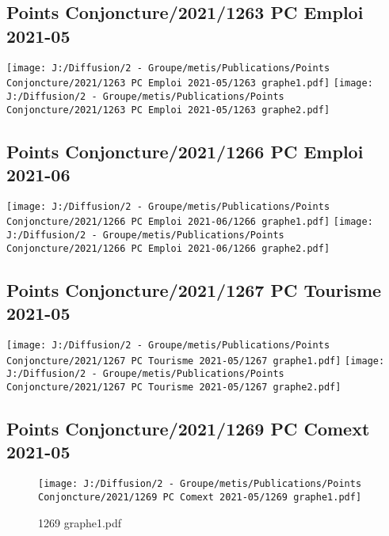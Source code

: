 \documentclass[
]{article}
\begin{document}
\hypertarget{points-conjoncture20211263-pc-emploi-2021-05}{%
\subsection{Points Conjoncture/2021/1263 PC Emploi
2021-05}\label{points-conjoncture20211263-pc-emploi-2021-05}}

\texttt{[image: J:/Diffusion/2 - Groupe/metis/Publications/Points Conjoncture/2021/1263 PC Emploi 2021-05/1263 graphe1.pdf]}
\texttt{[image: J:/Diffusion/2 - Groupe/metis/Publications/Points Conjoncture/2021/1263 PC Emploi 2021-05/1263 graphe2.pdf]}

\hypertarget{points-conjoncture20211266-pc-emploi-2021-06}{%
\subsection{Points Conjoncture/2021/1266 PC Emploi
2021-06}\label{points-conjoncture20211266-pc-emploi-2021-06}}

\texttt{[image: J:/Diffusion/2 - Groupe/metis/Publications/Points Conjoncture/2021/1266 PC Emploi 2021-06/1266 graphe1.pdf]}
\texttt{[image: J:/Diffusion/2 - Groupe/metis/Publications/Points Conjoncture/2021/1266 PC Emploi 2021-06/1266 graphe2.pdf]}

\hypertarget{points-conjoncture20211267-pc-tourisme-2021-05}{%
\subsection{Points Conjoncture/2021/1267 PC Tourisme
2021-05}\label{points-conjoncture20211267-pc-tourisme-2021-05}}

\texttt{[image: J:/Diffusion/2 - Groupe/metis/Publications/Points Conjoncture/2021/1267 PC Tourisme 2021-05/1267 graphe1.pdf]}
\texttt{[image: J:/Diffusion/2 - Groupe/metis/Publications/Points Conjoncture/2021/1267 PC Tourisme 2021-05/1267 graphe2.pdf]}

\hypertarget{points-conjoncture20211269-pc-comext-2021-05}{%
\subsection{Points Conjoncture/2021/1269 PC Comext
2021-05}\label{points-conjoncture20211269-pc-comext-2021-05}}

\begin{figure}
\centering
\texttt{[image: J:/Diffusion/2 - Groupe/metis/Publications/Points Conjoncture/2021/1269 PC Comext 2021-05/1269 graphe1.pdf]}
\caption{1269 graphe1.pdf}
\end{figure}
\end{document}
